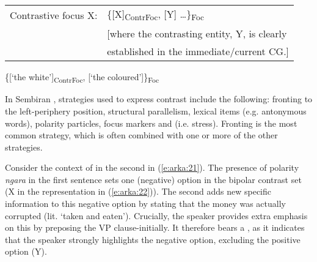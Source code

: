 \documentclass[output=paper
,modfonts
,nonflat]{langsci/langscibook}
\begin{document}
\begin{exe}
	\ex\label{e:arka:18}
	\begin{tabular}[t]{ll}
	Contrastive focus X:  & \{[X]\textsubscript{ContrFoc}, [Y] …\}\textsubscript{Foc}\\
	&[where the contrasting entity, Y, is clearly \\
	&established in the immediate/current CG.]
	\end{tabular}
\end{exe}

\begin{exe}
	\ex\label{e:arka:19}
	\begin{xlist}
		\label{e19q}
		 \citep[48]{Erteschick-Shir2007}\label{e:arka:19a}
	\end{xlist}
\end{exe}

\begin{exe}
	\ex\label{e:arka:20} \{[‘the white’]\textsubscript{ContrFoc}, [‘the coloured’]\}\textsubscript{Foc}
\end{exe}

\noindent
In Sembiran , strategies used to express contrast include the following: fronting to the left-periphery position, structural parallelism, lexical items (e.g. antonymous words), polarity particles, focus markers and  (i.e. stress). Fronting is the most common strategy, which is often combined with one or more of the other strategies.  

Consider the context of  in the second  in (\ref{e:arka:21}). The presence of polarity \textit{ngara} in the first sentence sets one (negative) option in the bipolar contrast set (X in the representation in (\ref{e:arka:22})). The second  adds new specific information to this negative option by stating that the money was actually corrupted (lit. ‘taken and eaten’). Crucially, the speaker provides extra emphasis on this by preposing the VP clause-initially. It therefore bears a , as it indicates that the speaker strongly highlights the negative option, excluding the positive option (Y).
\end{document}
